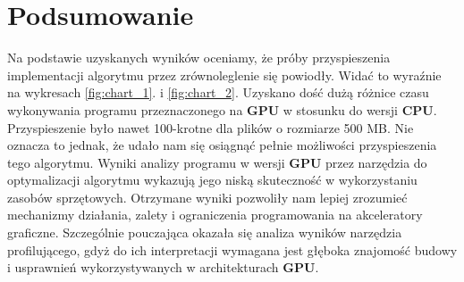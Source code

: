 \section{Podsumowanie}
Na podstawie uzyskanych wyników oceniamy, że próby przyspieszenia implementacji algorytmu przez zrównoleglenie się powiodły. Widać to wyraźnie na wykresach \ref{fig:chart_1}. i \ref{fig:chart_2}. Uzyskano dość dużą różnice czasu wykonywania programu przeznaczonego na \textbf{GPU} w stosunku do wersji \textbf{CPU}. Przyspieszenie było nawet 100-krotne  dla plików o rozmiarze 500 MB. Nie oznacza to jednak, że udało nam się osiągnąć pełnie możliwości przyspieszenia tego algorytmu. Wyniki analizy programu w wersji \textbf{GPU} przez narzędzia do optymalizacji algorytmu wykazują jego niską skuteczność w wykorzystaniu zasobów sprzętowych. 
Otrzymane wyniki pozwoliły nam lepiej zrozumieć mechanizmy działania, zalety i ograniczenia programowania na akceleratory graficzne. Szczególnie pouczająca okazała się analiza wyników narzędzia profilującego, gdyż do ich interpretacji wymagana jest głęboka znajomość budowy i usprawnień wykorzystywanych w architekturach \textbf{GPU}.